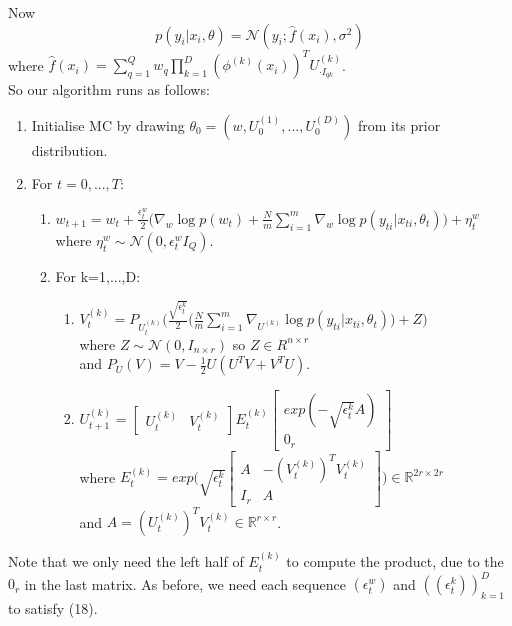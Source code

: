 \documentclass[a4paper,10pt]{article}
\begin{document}
Now 
\begin{equation}
p(y_i|x_i,\theta)=\mathcal{N}(y_i;\hat{f}(x_i),\sigma^2) 
\end{equation}
where $\hat{f}(x_i)=\sum_{q=1}^Q w_q \prod_{k=1}^D (\phi^{(k)}(x_i))^T U^{(k)}_{\cdot I_{qk}}$. \\ 
So our algorithm runs as follows:
\begin{enumerate}
\item Initialise MC by drawing $\theta_0=(w,U_0^{(1)},...,U_0^{(D)})$ from its prior distribution. 
\item For $t=0,...,T$:
\begin{enumerate}
\item $w_{t+1}= w_t + \frac{\epsilon_t^w}{2}\bigg(\nabla_w\log p(w_t)+\frac{N}{m} \sum_{i=1}^m \nabla_w\log p(y_{ti}|x_{ti},\theta_t) \bigg) + \eta_t^w$ \\
where $\eta_t^w \sim \mathcal{N}(0,\epsilon_t^w I_Q)$.
\item For k=1,...,D:
\begin{enumerate}
\item $V_t^{(k)}= P_{U_t^{(k)}}\bigg(\frac{\sqrt{\epsilon_t^k}}{2}\Big(\frac{N}{m} \sum_{i=1}^m \nabla_{U^{(k)}}\log p(y_{ti}|x_{ti},\theta_t) \Big)+Z\bigg)$ \\
where $Z \sim \mathcal{N}(0,I_{n \times r})$ so $Z \in R^{n \times r}$ \\ 
and $P_U(V)=V-\frac{1}{2}U(U^TV+V^TU)$.
\item $U_{t+1}^{(k)}=
\begin{bmatrix}
U_t^{(k)} & V_t^{(k)}
\end{bmatrix}
E_t^{(k)}
\begin{bmatrix}
exp(-\sqrt{\epsilon_t^k} A)\\
0_r
\end{bmatrix}$ \\
where $E_t^{(k)}=exp \bigg( \sqrt{\epsilon_t^k}
\begin{bmatrix}
A & -(V_t^{(k)})^T V_t^{(k)} \\
I_r & A
\end{bmatrix}
\bigg) \in \mathbb{R}^{2r \times 2r}$ \\
and $A=(U_t^{(k)})^T V_t^{(k)} \in \mathbb{R}^{r \times r}$.
\end{enumerate}
\end{enumerate}
\end{enumerate}
Note that we only need the left half of $E_t^{(k)}$ to compute the product, due to the $0_r$ in the last matrix.
As before, we need each sequence $(\epsilon_t^w)$ and $((\epsilon_t^k))_{k=1}^D$ to satisfy (18). \\
\end{document}
